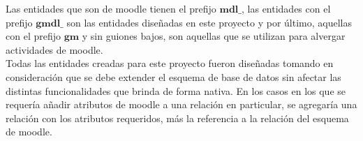 


    Las entidades que son de moodle tienen el prefijo \(\textbf{mdl\_}\), las entidades con el prefijo
 \(\textbf{gmdl\_}\) son las entidades diseñadas en este proyecto y por último, aquellas con el prefijo
 \(\textbf{gm}\) y sin guiones bajos, son aquellas que se utilizan para alvergar actividades de moodle.\\

 \noindent Todas las entidades creadas para este proyecto fueron diseñadas tomando en
 consideración que se debe extender el esquema de base de datos sin afectar las distintas
 funcionalidades que brinda de forma nativa. En los casos en los que se requería añadir
 atributos de moodle a una relación en particular, se agregaría una relación con los atributos
 requeridos, más la referencia a la relación del esquema de moodle.



\newcommand{\schemeName}[1]{%
    \vspace{-1em}\hfill Nombre en el esquema: {\it #1}\ \ \par%
}

    

    
    
    
    
    
    




